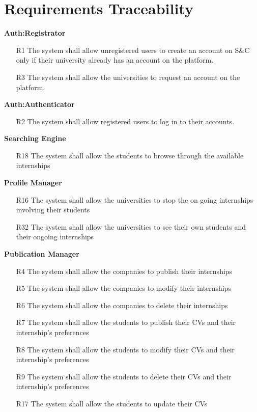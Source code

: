 \documentclass{article}
\begin{document}
\section{Requirements Traceability}

\textbf{Auth:Registrator}
\begin{itemize}
    \item [R1] The system shall allow unregistered users to create an account on S\&C only if their university already has an account on the platform.
    \item [R3] The system shall allow the universities to request an account on the platform.
\end{itemize}

\textbf{Auth:Authenticator}
\begin{itemize}
    \item [R2] The system shall allow registered users to log in to their accounts.
\end{itemize}

\textbf{Searching Engine}
\begin{itemize}
    \item [R18] The system shall allow the students to browse through the available internships
\end{itemize}

\textbf{Profile Manager}
\begin{itemize}
    \item [R16] The system shall allow the universities to stop the on going internships involving their students
    \item [R32] The system shall allow the universities to see their own students and their ongoing internships
\end{itemize}

\textbf{Publication Manager}
\begin{itemize}
    \item [R4] The system shall allow the companies to publish their internships
    \item [R5] The system shall allow the companies to modify their internships
    \item [R6] The system shall allow the companies to delete their internships
    \item [R7] The system shall allow the students to publish their CVs and their internship's preferences 
    \item [R8] The system shall allow the students to modify their CVs and their internship's preferences 
    \item [R9] The system shall allow the students to delete their CVs and their internship's preferences
    \item [R17] The system shall allow the students to update their CVs
\end{itemize}
\end{document}
